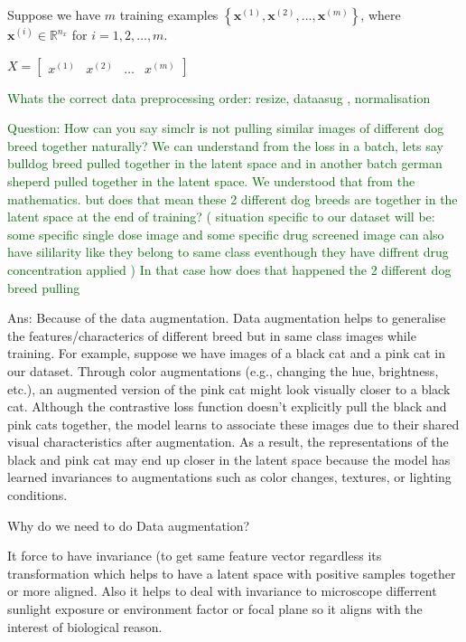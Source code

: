 \documentclass[12pt,twoside,a4paper,parskip]{scrbook} %
\begin{document}
Suppose we have \( m \) training examples \( \left\{ \mathbf{x}^{(1)}, \mathbf{x}^{(2)}, \ldots, \mathbf{x}^{(m)} \right\} \), where \( \mathbf{x}^{(i)} \in \mathbb{R}^{n_{x}} \) for \( i = 1, 2, \ldots, m \).

\( X = \begin{bmatrix} x^{(1)} & x^{(2)} & \dots & x^{(m)} \end{bmatrix} \)

\textcolor{darkgreen}{Whats the correct data preprocessing order: resize, dataasug , normalisation}


\textcolor{darkgreen}{Question: How can you say simclr is not pulling similar images of different dog breed together naturally? We can understand from the loss in a batch, lets say bulldog breed pulled together in the latent space and in another batch german sheperd pulled together in the latent space. We understood that from the mathematics. but does that mean these 2 different dog breeds are together in the latent space at the end of training? ( situation specific to our dataset will be: some specific single dose image and some specific drug screened image can also have sililarity like they belong to same class eventhough they have diffrent drug concentration applied ) In that case how does that happened the 2 different dog breed pulling}

Ans: Because of the data augmentation. Data augmentation helps to generalise the features/characterics of different breed but in same class images while training. For example, suppose we have images of a black cat and a pink cat in our dataset. Through color augmentations (e.g., changing the hue, brightness, etc.), an augmented version of the pink cat might look visually closer to a black cat. Although the contrastive loss function doesn’t explicitly pull the black and pink cats together, the model learns to associate these images due to their shared visual characteristics after augmentation. As a result, the representations of the black and pink cat may end up closer in the latent space because the model has learned invariances to augmentations such as color changes, textures, or lighting conditions.


Why do we need to do Data augmentation? 

It force to have invariance (to get same feature vector regardless its transformation which helps to have a latent space with positive samples together or more aligned. Also it helps to deal with invariance to microscope differrent sunlight exposure or environment factor or focal plane so it aligns with the interest of biological reason.
\end{document}
